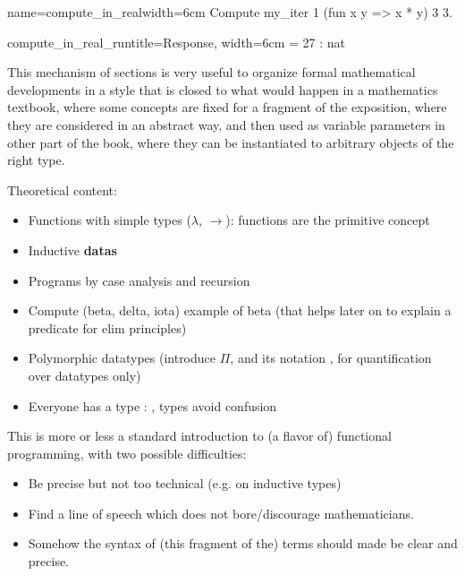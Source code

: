 \begin{coq}{name=compute_in_real}{width=6cm}
Compute my_iter 1
    (fun x y => x * y) 3 3.
\end{coq}
\begin{coqout}{compute_in_real_run}{title=Response, width=6cm}
= 27 : nat
\end{coqout}

This mechanism of sections is very useful to organize formal
mathematical developments in a style that is closed to what would
happen in a mathematics textbook, where some concepts are fixed for a
fragment of the exposition, where they are considered in an abstract
way, and then used as variable parameters in other part of the book,
where they can be instantiated to arbitrary objects of the right type.


Theoretical content:
\begin{itemize}
\item Functions with simple types ($\lambda$, $\rightarrow$): functions are the primitive concept
\item Inductive {\bf datas}
\item Programs by case analysis and recursion
\item Compute (beta, delta, iota) example of beta (that helps later on to explain a predicate for elim principles)
\item Polymorphic datatypes (introduce $\Pi$, and its \Coq{} notation
  , for quantification over datatypes only)
\item Everyone has a type : , types avoid confusion
\end{itemize}
This is more or less a standard introduction to (a flavor of)
functional programming, with two possible difficulties:
\begin{itemize}
\item Be precise but not too technical (e.g. on inductive types)
\item Find a line of speech which does not bore/discourage
  mathematicians.
\item Somehow the syntax of (this fragment of the) terms should made
  be clear and precise.
\end{itemize}



